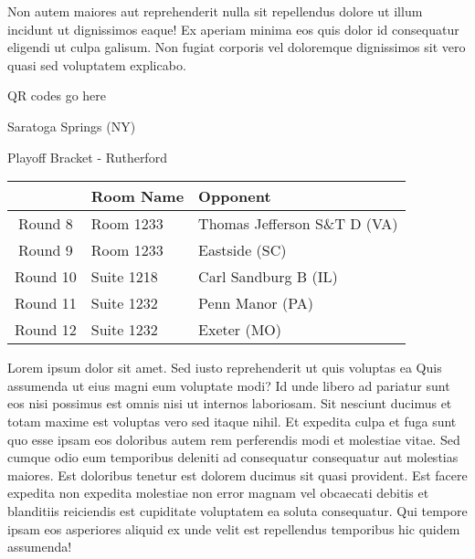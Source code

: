 \documentclass{article}%
\begin{document}
\newline%
Non autem maiores aut reprehenderit nulla sit repellendus dolore ut illum incidunt ut dignissimos eaque! Ex aperiam minima eos quis dolor id consequatur eligendi ut culpa galisum. Non fugiat corporis vel doloremque dignissimos sit vero quasi sed voluptatem explicabo.\newline%
\newline%
%
\vspace*{30pt}%
\begin{center}%
\begin{Huge}%
QR codes go here%
\end{Huge}%
\end{center}%
\newpage%
\begin{center}%
\begin{Huge}%
Saratoga Springs (NY)%
\end{Huge}%
\vspace*{8pt}%
\linebreak%
\begin{Large}%
Playoff Bracket {-} Rutherford%
\end{Large}%
\end{center}%
\begin{tabularx}{\textwidth}{|c|Y|Y|}%
\hline%
&Room Name&Opponent\\%
\hline%
Round 8&Room 1233&Thomas Jefferson S\&T D (VA)\\%
Round 9&Room 1233&Eastside (SC)\\%
Round 10&Suite 1218&Carl Sandburg B (IL)\\%
Round 11&Suite 1232&Penn Manor (PA)\\%
Round 12&Suite 1232&Exeter (MO)\\%
\hline%
\end{tabularx}%
\vspace*{8pt}%
\linebreak%
\newline%
\newline%
Lorem ipsum dolor sit amet. Sed iusto reprehenderit ut quis voluptas ea Quis assumenda ut eius magni eum voluptate modi? Id unde libero ad pariatur sunt eos nisi possimus est omnis nisi ut internos laboriosam. Sit nesciunt ducimus et totam maxime est voluptas vero sed itaque nihil. Et expedita culpa et fuga sunt quo esse ipsam eos doloribus autem rem perferendis modi et molestiae vitae.\newline%
\newline%
Sed cumque odio eum temporibus deleniti ad consequatur consequatur aut molestias maiores. Est doloribus tenetur est dolorem ducimus sit quasi provident. Est facere expedita non expedita molestiae non error magnam vel obcaecati debitis et blanditiis reiciendis est cupiditate voluptatem ea soluta consequatur. Qui tempore ipsam eos asperiores aliquid ex unde velit est repellendus temporibus hic quidem assumenda!\newline%
\end{document}
